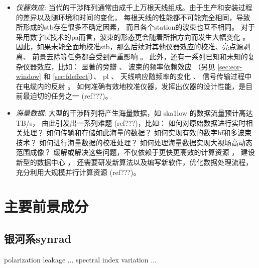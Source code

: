 \begin{itemize}
\item
\emph{仪器效应:}
当代的干涉阵列通常由成千上万根天线组成。由于生产和安装过程的差异以及随环境和时间的变化，
每根天线的性能都不可能完全相同，导致所形成的\acl{stb}存在很多不确定因素，
而且各个\acl{station}的波束也互不相同。
对于采用数字\acl{bf}技术的\acl{pa}而言，波束的形态更会随着所指方向而发生大幅变化
\cite{smirnov2011iii,vanWeeren2016,jagannathan2017}。
因此，如果未能全面地校准\acl{stb}，那么后续对其他仪器效应的校准、亮点源剥离、
前景去除等任务都会受到严重影响 \cite{noordam2004,neben2016}。
此外，还有一系列已知和未知的复杂仪器效应，比如：
显著的旁瓣 \cite{thyagarajan2015,mort2017}、
波束的频率依赖效应 \cite{liu2009ps,datta2010,morales2012}
（另见 \autoref{sec:eor-window} 和 \autoref{sec:fdeffect}）、
\acl{pl} \cite{asad2016,asad2018,lenc2017}、
天线响应随频率的变化 \cite{bernardi2015,trott2017}、
信号传输过程中在电缆内的反射 \cite{beardsley2016}。
如何准确有效地校准仪器，发挥出仪器的设计性能，是目前最迫切的任务之一
\cite{wijnholds2010} (ref???)。

\item
\emph{海量数据:}
大型的干涉阵列将产生海量数据，如 \acs{ska1low} 的数据流量预计高达 TB/s，
由此引发出一系列难题 \cite{norris2011} (ref???)，比如：
如何对原始数据进行实时相关处理？
如何传输和存储如此海量的数据？
如何实现有效的数字\acl{bf}和多波束技术？
如何进行海量数据的校准处理？
如何处理海量数据实现大视场高动态范围成像？
缓解或解决这些问题，不仅依赖于更快更高效的计算资源 \cite{magro2014,vermij2017}，
建设新型的数据中心 \cite{chrysostomou2018}，
还需要研发新算法以及编写新软件，优化数据处理流程，充分利用大规模并行计算资源
\cite{morales2009,} (ref???)。

\end{itemize}


\section{主要前景成分}
\label{sec:fg-intro}

\subsection{银河系\acl*{synrad}}  %

polarization leakage ...
spectral index variation ...

